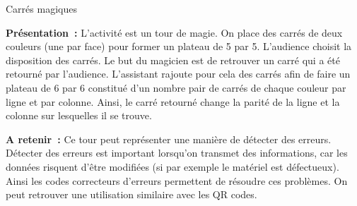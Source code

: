 \documentclass[a4paper,11pt]{article}
\begin{document}
 
 
\begin{center}
\huge
Carrés magiques
\end{center}

\textbf{Présentation~:} L'activité est un tour de magie. On place des carrés de deux couleurs (une par face) pour former un plateau de 5 par 5. L'audience choisit la disposition des carrés. Le but du magicien est de retrouver un carré qui a été retourné par l'audience. L'assistant rajoute pour cela des carrés afin de faire un plateau de 6 par 6 constitué d'un nombre pair de carrés de chaque couleur par ligne et par colonne. Ainsi, le carré retourné change la parité de la ligne et la colonne sur lesquelles il se trouve.

\textbf{A retenir~:} Ce tour peut représenter une manière de détecter des erreurs. Détecter des erreurs est important lorsqu'on transmet des informations, car les données risquent d'être modifiées (si par exemple le matériel est défectueux). Ainsi les codes correcteurs d'erreurs permettent de résoudre ces problèmes. On peut retrouver une utilisation similaire avec les QR codes.
\end{document}
